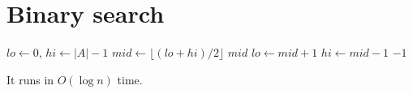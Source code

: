 \documentclass{article}
\begin{document}
\section{Binary search}
\begin{algorithm}
\caption{Binary search}
\begin{algorithmic}[1]
  \State $lo \gets 0$, $hi \gets |A| - 1$
    \State $mid \gets \lfloor (lo+hi)/2 \rfloor$
     \State \Return $mid$
     \State $lo \gets mid + 1$
    \Else \State $hi \gets mid - 1$
    \EndIf
  \EndWhile
  \State \Return $-1$
\EndFunction
\end{algorithmic}
\end{algorithm}
It runs in $O(\log n)$ time.
\end{document}
